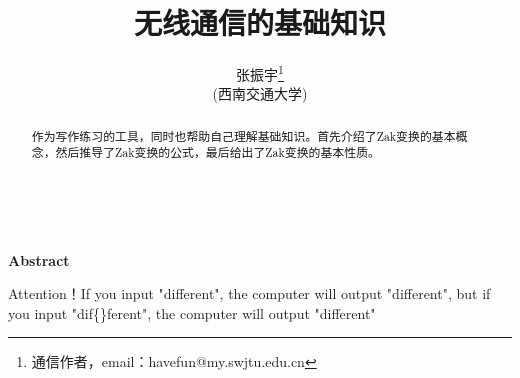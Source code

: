 \documentclass[12pt,a4paper]{article}%
\title{\fontsize{18pt}{27pt}\selectfont%
	{\heiti%
		无线通信的基础知识}}%
\author{\fontsize{12pt}{18pt}\selectfont%
	{\fangsong%
		张振宇}\thanks{通信作者，email：havefun@my.swjtu.edu.cn}\\%
	\fontsize{10.5pt}{15.75pt}\selectfont%
	{\fangsong%
		(西南交通大学)}}%
\date{}%
\begin{document}
	\maketitle%
	\lhead{}%
	\chead{}%
	\rhead{}%
	\lfoot{}%
	\cfoot{\thepage}%
	\rfoot{}%
	\begin{abstract}
		\fangsong 作为写作练习的工具，同时也帮助自己理解基础知识。首先介绍了Zak变换的基本概念，然后推导了Zak变换的公式，最后给出了Zak变换的基本性质。\\
	\end{abstract}
	
	\begin{adjustwidth}{1.06cm}{1.06cm}
		\fontsize{10.5pt}{15.75pt}\\
	\end{adjustwidth}
	
	\begin{center}%
		{\textbf{Abstract}}%
	\end{center}
	\begin{adjustwidth}{1.06cm}{1.06cm}%
		\hspace{1.5em}Attention！If you input "dif{}ferent", the computer will output "different", but if you input "dif\{\}ferent", the computer will output "dif{}ferent"
	\end{adjustwidth}
	\newpage%
\end{document}
